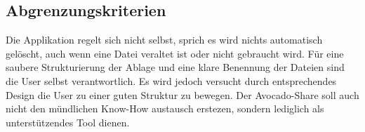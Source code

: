 \subsection{Abgrenzungskriterien}
Die Applikation regelt sich nicht selbst, sprich es wird nichts automatisch gelöscht, auch wenn eine Datei veraltet ist oder nicht gebraucht wird. Für eine saubere Strukturierung der Ablage und eine klare Benennung der Dateien sind die User selbst verantwortlich. Es wird jedoch versucht durch entsprechendes Design die User zu einer guten Struktur zu bewegen. Der Avocado-Share soll auch nicht den mündlichen Know-How austausch erstezen, sondern lediglich als unterstützendes Tool dienen.